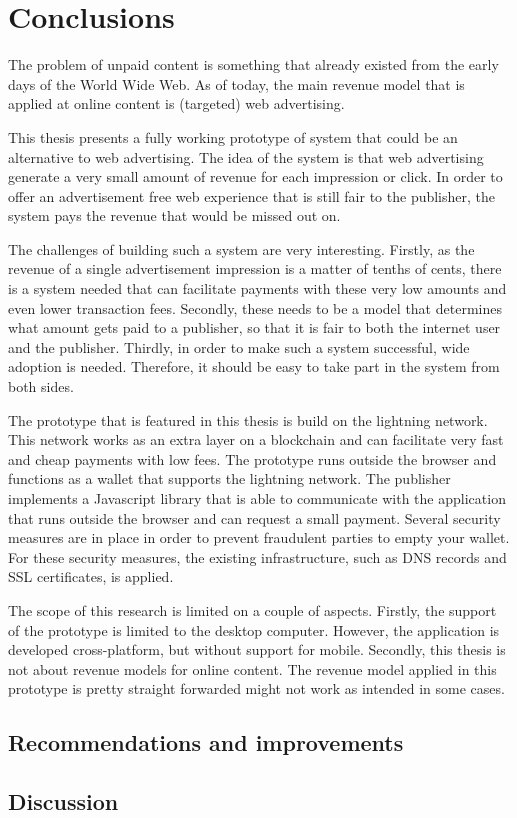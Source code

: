 \chapter{Conclusions}
\label{cha:conclusion}

The problem of unpaid content is something that already existed from the early days of the World Wide Web. As of today, the main revenue model that is applied at online content is (targeted) web advertising.

This thesis presents a fully working prototype of system that could be an alternative to web advertising. The idea of the system is that web advertising generate a very small amount of revenue for each impression or click. In order to offer an advertisement free web experience that is still fair to the publisher, the system pays the revenue that would be missed out on. 

The challenges of building such a system are very interesting. Firstly, as the revenue of a single advertisement impression is a matter of tenths of cents, there is a system needed that can facilitate payments with these very low amounts and even lower transaction fees. Secondly, these needs to be a model that determines what amount gets paid to a publisher, so that it is fair to both the internet user and the publisher. Thirdly, in order to make such a system successful, wide adoption is needed. Therefore, it should be easy to take part in the system from both sides.

The prototype that is featured in this thesis is build on the lightning network. This network works as an extra layer on a blockchain and can facilitate very fast and cheap payments with low fees. The prototype runs outside the browser and functions as a wallet that supports the lightning network. The publisher implements a Javascript library that is able to communicate with the application that runs outside the browser and can request a small payment. Several security measures are in place in order to prevent fraudulent parties to empty your wallet. For these security measures, the existing infrastructure, such as DNS records and SSL certificates, is applied. 

The scope of this research is limited on a couple of aspects. Firstly, the support of the prototype is limited to the desktop computer. However, the application is developed cross-platform, but without support for mobile. Secondly, this thesis is not about revenue models for online content. The revenue model applied in this prototype is pretty straight forwarded might not work as intended in some cases. 





% 

\section{Recommendations and improvements}

\section{Discussion}